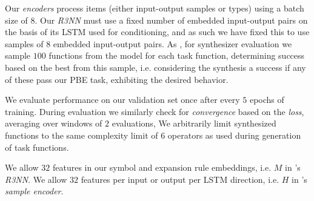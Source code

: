 \documentclass{article}
\begin{document}
Our \emph{encoders} process items (either input-output samples or types) using a batch size of $8$.
Our \emph{R3NN} must use a fixed number of embedded input-output pairs on the basis of its LSTM used for conditioning,
and as such we have fixed this to use samples of $8$ embedded input-output pairs.
As \citet{nsps}, for synthesizer evaluation we sample $100$ functions from the model for each task function,
determining success based on the best from this sample,
i.e. considering the synthesis a success if any of these pass our PBE task, exhibiting the desired behavior.

We evaluate performance on our validation set once after every $5$ epochs of training.
During evaluation we similarly check for \emph{convergence} based on the \emph{loss},
averaging over windows of $2$ evaluations,
We arbitrarily limit synthesized functions to the same complexity limit of $6$ operators as used during generation of task functions.

We allow $32$ features in our symbol and expansion rule embeddings, i.e. $M$ in \citet{nsps}'s \emph{R3NN}.
We allow $32$ features per input or output per LSTM direction, i.e. $H$ in \citet{nsps}'s \emph{sample encoder}.
\end{document}
